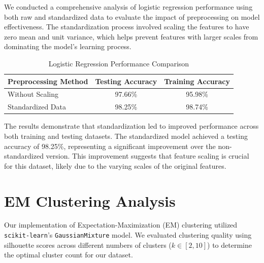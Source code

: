 \documentclass[11pt]{article}
\newcommand{\code}[1]{\texttt{#1}}
\begin{document}
We conducted a comprehensive analysis of logistic regression performance using both raw and standardized data to evaluate the impact of preprocessing on model effectiveness. The standardization process involved scaling the features to have zero mean and unit variance, which helps prevent features with larger scales from dominating the model's learning process.

\begin{table}[H]
\centering
\caption{Logistic Regression Performance Comparison}
\label{tab:log-accuracy}
\begin{tabular}{@{}lcc@{}}
\toprule
Preprocessing Method & Testing Accuracy & Training Accuracy \\ \midrule
Without Scaling & 97.66\% & 95.98\% \\
Standardized Data & 98.25\% & 98.74\% \\
\bottomrule
\end{tabular}
\end{table}

The results demonstrate that standardization led to improved performance across both training and testing datasets. The standardized model achieved a testing accuracy of 98.25\%, representing a significant improvement over the non-standardized version. This improvement suggests that feature scaling is crucial for this dataset, likely due to the varying scales of the original features.

\section{EM Clustering Analysis}

Our implementation of Expectation-Maximization (EM) clustering utilized \code{scikit-learn}'s \code{GaussianMixture} model. We evaluated clustering quality using silhouette scores across different numbers of clusters ($k \in [2,10]$) to determine the optimal cluster count for our dataset.
\end{document}
